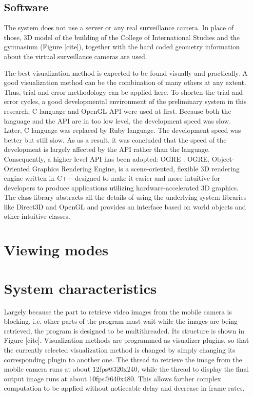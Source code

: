 \subsection{Software}

The system does not use a server or any real surveillance camera. In place of those, 3D model of the building of the College of International Studies and the gymnasium (Figure [cite]), together with the hard coded geometry information about the virtual surveillance cameras are used.

The best visualization method is expected to be found visually and practically. A good visualization method can be the combination of many others at any extent. Thus, trial and error methodology can be applied here. To shorten the trial and error cycles, a good developmental environment of the preliminary system in this research, C language and OpenGL API \citep{Reference10} were used at first. Because both the language and the API are in too low level, the development speed was slow. Later, C language was replaced by Ruby language. The development speed was better but still slow. As as a result, it was concluded that the speed of the development is largely affected by the API rather than the language. Consequently, a higher level API has been adopted: OGRE \citep{Reference11}. OGRE, Object-Oriented Graphics Rendering Engine, is a scene-oriented, flexible 3D rendering engine written in C++ designed to make it easier and more intuitive for developers to produce applications utilizing hardware-accelerated 3D graphics. The class library abstracts all the details of using the underlying system libraries like Direct3D and OpenGL and provides an interface based on world objects and other intuitive classes.

\section{Viewing modes}

\section{System characteristics}

Largely because the part to retrieve video images from the mobile camera is blocking, i.e. other parts of the program must wait while the images are being retrieved, the program is designed to be multithreaded. Its structure is shown in Figure [cite]. Visualization methods are programmed as visualizer plugins, so that the currently selected visualization method is changed by simply changing its corresponding plugin to another one. The thread to retrieve the image from the mobile camera runs at about 12fps@320x240, while the thread to display the final output image runs at about 10fps@640x480. This allows farther complex computation to be applied without noticeable delay and decrease in frame rates.
